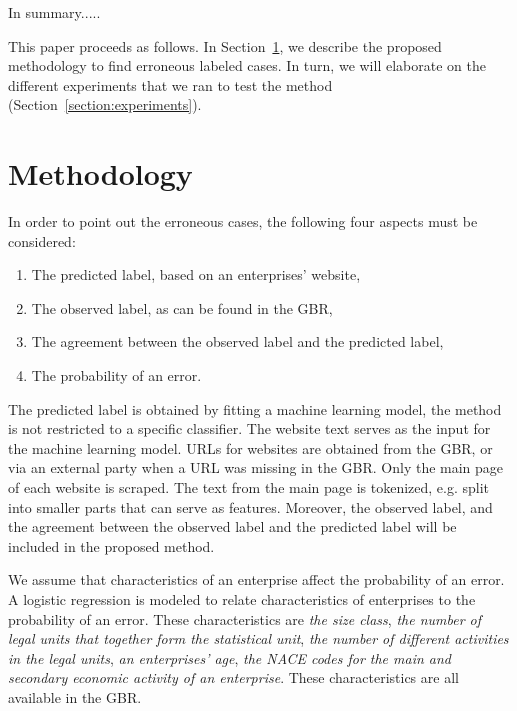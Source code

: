 \documentclass[12pt, a4paper, titlepage]{article}
\begin{document}
In summary.....

\bigskip

This paper proceeds as follows. In Section~\ref{section:method}, we describe the proposed methodology to find erroneous labeled cases. In turn, we will elaborate on the different experiments that we ran to test the method (Section~\ref{section:experiments}). 




							\section{Methodology}
							\label{section:method}

In order to point out the erroneous cases, the following four aspects must be considered:
\begin{enumerate}
\item The predicted label, based on an enterprises' website,
\item The observed label, as can be found in the GBR,
\item The agreement between the observed label and the predicted label,
\item The probability of an error.
\end{enumerate}

The predicted label is obtained by fitting a machine learning model, the method is not restricted to a specific classifier.  The website text serves as the input for the machine learning model. URLs for websites are obtained from the GBR, or via an external party when a URL was missing in the GBR. Only the main page of each website is scraped. The text from the main page is tokenized, e.g. split into smaller parts that can serve as features. Moreover, the observed label, and the agreement between the observed label and the predicted label will be included in the proposed method.

We assume that characteristics of an enterprise affect the probability of an error. A logistic regression is modeled to relate characteristics of enterprises to the probability of an error. These characteristics are \textit{the size class}, \textit{the number of legal units that together form the statistical unit}, \textit{the number of different activities in the legal units}, \textit{an enterprises' age}, \textit{the NACE codes for the main and secondary economic activity of an enterprise}. These characteristics are all available in the GBR.
\bigskip
\end{document}
